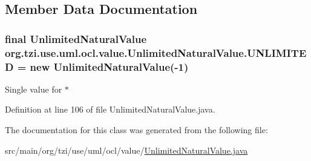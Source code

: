 \subsection{Member Data Documentation}
\hypertarget{classorg_1_1tzi_1_1use_1_1uml_1_1ocl_1_1value_1_1_unlimited_natural_value_add14d1105560884a59ccecb32a023090}{
\subsubsection[{U\-N\-L\-I\-M\-I\-T\-E\-D}]{\setlength{\rightskip}{0pt plus 5cm}final {\bf Unlimited\-Natural\-Value} org.\-tzi.\-use.\-uml.\-ocl.\-value.\-Unlimited\-Natural\-Value.\-U\-N\-L\-I\-M\-I\-T\-E\-D = new {\bf Unlimited\-Natural\-Value}(-\/1)\hspace{0.3cm}{\ttfamily [static]}}}\label{classorg_1_1tzi_1_1use_1_1uml_1_1ocl_1_1value_1_1_unlimited_natural_value_add14d1105560884a59ccecb32a023090}
Single value for $\ast$ 

Definition at line 106 of file Unlimited\-Natural\-Value.\-java.



The documentation for this class was generated from the following file\-:\begin{DoxyCompactItemize}
\item 
src/main/org/tzi/use/uml/ocl/value/\hyperlink{_unlimited_natural_value_8java}{Unlimited\-Natural\-Value.\-java}\end{DoxyCompactItemize}
